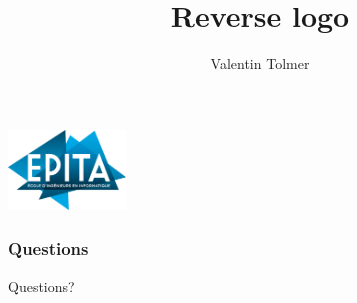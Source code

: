 \documentclass{beamer}
\title{Reverse logo}
\author{Valentin Tolmer}
\date{}
\institute{Nuit de l'info -- EPITA 2015}
\begin{document}
\begin{frame}
  \titlepage
    \includegraphics[height=60pt]{../assets/logo-epita-hd.png}
\end{frame}

\begin{frame}
  \tableofcontents[pausesections ]
\end{frame}







\begin{frame}
\frametitle{Questions}
  Questions?
\end{frame}
\end{document}
